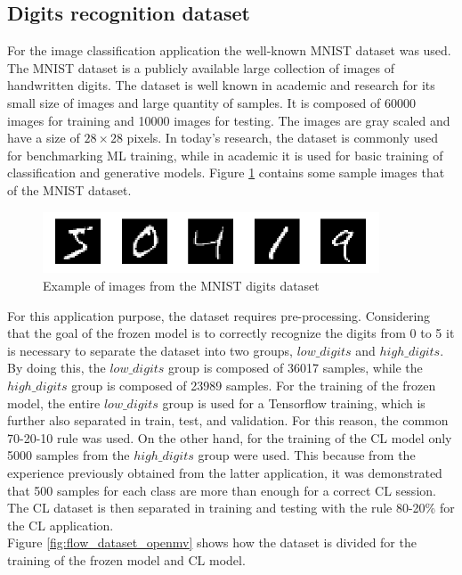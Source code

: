 \documentclass[12pt]{report}
\begin{document}
\subsection{Digits recognition dataset}
For the image classification application the well-known MNIST dataset was used. The MNIST dataset is a publicly available large collection of images of handwritten digits. The dataset is well known in academic and research for its small size of images and large quantity of samples. It is composed of 60000 images for training and 10000 images for testing. The images are gray scaled and have a size of $28 \times 28$ pixels. In today's research, the dataset is commonly used for benchmarking ML training, while in academic it is used for basic training of classification and generative models. Figure \ref{fig:mnist_dataset} contains some sample images that of the MNIST dataset.\\

\begin{figure}[h!]
    \centering
    \includegraphics[width=100mm]{Figures/Chapter4/mnist_dataset.png} 
    \caption{Example of images from the MNIST digits dataset}
    \label{fig:mnist_dataset}    
\end{figure}

For this application purpose, the dataset requires pre-processing. Considering that the goal of the frozen model is to correctly recognize the digits from 0 to 5 it is necessary to separate the dataset into two groups, $low\_digits$ and $high\_digits$. By doing this, the $low\_digits$ group is composed of 36017 samples, while the $high\_digits$ group is composed of 23989 samples. For the training of the frozen model, the entire $low\_digits$ group is used for a Tensorflow training, which is further also separated in train, test, and validation. For this reason, the common 70-20-10 rule was used. On the other hand, for the training of the CL model only 5000 samples from the $high\_digits$ group were used. This because from the experience previously obtained from the latter application, it was demonstrated that 500 samples for each class are more than enough for a correct CL session. The CL dataset is then separated in training and testing with the rule 80-20\% for the CL application. \\
Figure \ref{fig:flow_dataset_openmv} shows how the dataset is divided for the training of the frozen model and CL model.
\end{document}
